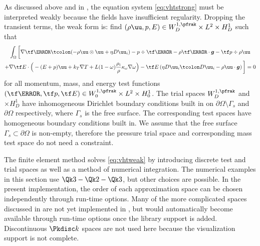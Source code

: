 As discussed above and in , the equation system \eqref{eq:vhtstrong} must be interpreted weakly because the fields have insufficient regularity.
Dropping the transient terms, the weak form is: find $(\rho\uu,p,E) \in W^{1,\pfrak}_D \times L^2 \times H^1_D$ such that
\begin{multline}\label{eq:vhtweak}
  \int_\Omega \bigg[
    \nabla\tf\mm \tcolon ( -\rho\uu\otimes\uu + \eta D\uu_i) - p\div\tf\mm - \rho \tf\mm\cdot \bm g -\tf p \div \rho\uu \\
    + \nabla\tf E \cdot \Big(
      -(E+p)\uu + k_T\nabla T + L (1-\omega)\frac{\rho_i}{\rho}\kappa_\omega\nabla\omega
    \Big) - \tf E \left( \eta D\uu_i\tcolon D\uu_i - \rho\uu\cdot\bm g \right)
    \bigg] = 0
\end{multline}
for all momentum, mass, and energy test functions $(\tf\mm,\tf p,\tf E) \in W^{1,\pfrak}_0 \times L^2 \times H^1_0$.
The trial spaces $W^{1,\pfrak}_D$ and $\times H^1_D$ have inhomogeneous Dirichlet boundary conditions built in on $\partial\Omega\setminus \Gamma_s$ and $\partial\Omega$ respectively, where $\Gamma_s$ is the free surface.
The corresponding test spaces have homogeneous boundary conditions built in.
We assume that the free surface $\Gamma_s \subset \partial\Omega$ is non-empty, therefore the pressure trial space and corresponding mass test space do not need a constraint.

The finite element method solves \eqref{eq:vhtweak} by introducing discrete test and trial spaces as well as a method of numerical integration.
The numerical examples in this section use $\Qk 3 - \Qk 2 - \Qk 3$, but other choices are possible.
In the present implementation, the order of each approximation space can be chosen independently through run-time options.
Many of the more complicated spaces discussed in  are not yet implemented in {\Dohp}, but would automatically become available through run-time options once the library support is added.
Discontinuous $\Pkdisc k$ spaces are not used here because the visualization support is not complete.

